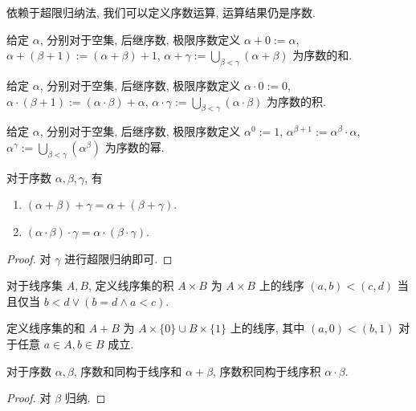 依赖于超限归纳法, 我们可以定义序数运算, 运算结果仍是序数.

\begin{definition}
    给定 \(\alpha\), 分别对于空集, 后继序数, 极限序数定义 \(\alpha + 0 := \alpha\), \(\alpha + (\beta + 1) := (\alpha + \beta) + 1\), \(\alpha + \gamma := \bigcup_{\beta < \gamma} (\alpha + \beta)\) 为序数的和.
\end{definition}

\begin{definition}
    给定 \(\alpha\), 分别对于空集, 后继序数, 极限序数定义 \(\alpha \cdot 0 := 0\), \(\alpha \cdot (\beta + 1) := (\alpha \cdot \beta) + \alpha\), \(\alpha \cdot \gamma := \bigcup_{\beta < \gamma} (\alpha \cdot \beta)\) 为序数的积.
\end{definition}

\begin{definition}
    给定 \(\alpha\), 分别对于空集, 后继序数, 极限序数定义 \(\alpha^0 := 1\), \(\alpha^{\beta + 1} := \alpha^\beta \cdot \alpha\), \(\alpha^\gamma := \bigcup_{\beta < \gamma} (\alpha^\beta)\) 为序数的幂.
\end{definition}

\begin{lemma}
    对于序数 \(\alpha, \beta, \gamma\), 有
    \begin{enumerate}
        \item \((\alpha + \beta) + \gamma = \alpha + (\beta + \gamma)\).
        \item \((\alpha \cdot \beta) \cdot \gamma = \alpha \cdot (\beta \cdot \gamma)\).
    \end{enumerate}

    \begin{proof}
        对 \(\gamma\) 进行超限归纳即可.
    \end{proof}
\end{lemma}

\begin{definition}
    对于线序集 \(A, B\), 定义线序集的积 \(A \times B\) 为 \(A \times B\) 上的线序 \((a,b) < (c,d)\) 当且仅当 \(b < d \lor (b = d \land a < c)\).

    定义线序集的和 \(A + B\) 为 \(A \times \{0\} \cup B \times \{1\}\) 上的线序, 其中 \((a,0) < (b,1)\) 对于任意 \(a \in A, b \in B\) 成立.
\end{definition}

\begin{definition}
    对于序数 \(\alpha, \beta\), 序数和同构于线序和 \(\alpha + \beta\), 序数积同构于线序积 \(\alpha \cdot \beta\).

    \begin{proof}
        对 \(\beta\) 归纳.
    \end{proof}
\end{definition}


